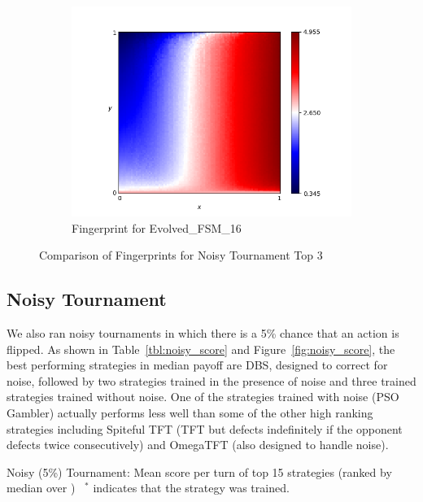 \documentclass{article}
\begin{document}
\begin{figure}[!hbtp]
\begin{subfigure}[t]{.3\textwidth}
        \centering
        \includegraphics[width=\textwidth]{./assets/Evolved_FSM_16.png}
        \caption{Fingerprint for Evolved\_FSM\_16}
    \end{subfigure}%

    \caption{Comparison of Fingerprints for Noisy Tournament Top 3}
    \label{fig:comparison_fingerprint_noisy}
\end{figure}


\subsection{Noisy Tournament}

We also ran noisy tournaments in which there is a 5\% chance that an action is
flipped. As shown in Table~\ref{tbl:noisy_score} and
Figure~\ref{fig:noisy_score}, the best performing strategies in median payoff
are DBS, designed to correct for noise, followed by two strategies trained in
the presence of noise and three trained strategies trained without noise. One of
the strategies trained with noise (PSO Gambler) actually performs less well than
some of the other high ranking strategies including
Spiteful TFT (TFT but defects indefinitely if the opponent defects twice
consecutively) and OmegaTFT (also designed to handle noise).

\begin{table}[!hbtp]
    \centering
        
        \caption{Noisy (5\%) Tournament: Mean score per turn of top 15 strategies
        (ranked by median over
        \protecttournaments)
        ~$^{*}$ indicates that the strategy was trained.}
        \label{tbl:noisy_score}
\end{table}
\end{document}
